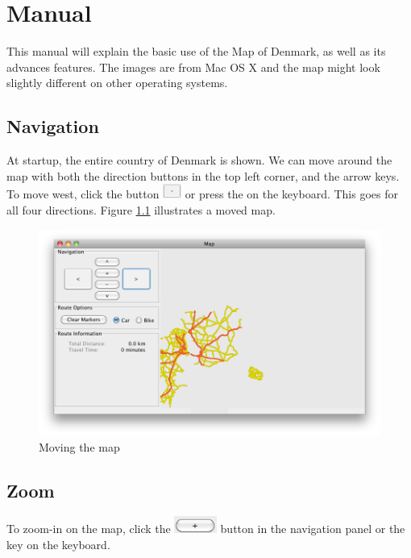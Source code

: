 \chapter{Manual}
\label{MAN}

This manual will explain the basic use of the Map of Denmark, as well as its
advances features. The images are from Mac OS X and the map might look slightly
different on other operating systems.

\section{Navigation}
\label{MAN-N}
At startup, the entire country of Denmark is shown. We can move around the
map with both the direction buttons in the top left corner, and the arrow keys.
To move west, click the button
\includegraphics[height=1.3em]{images/westbutton.png} or press the  on the keyboard. This goes for all four directions. Figure
\ref{MAN-N-MOV} illustrates a moved map.

\begin{figure}[h!]
\centering
\includegraphics[width=1\linewidth]{images/man-move.png}
\caption{Moving the map}
\label{MAN-N-MOV}
\end{figure}

\section{Zoom}
\label{MAN-Z}
To zoom-in on the map, click the
\includegraphics[height=1.5em]{images/zoominbutton.png} button in the navigation
panel or the  key on the keyboard.

